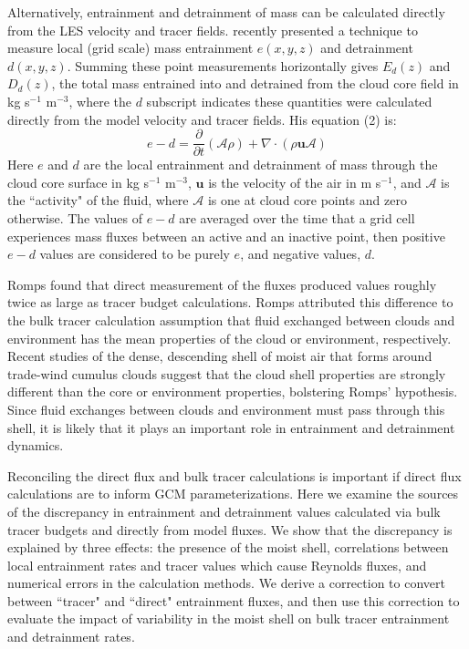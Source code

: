 \documentclass[12pt]{article}
\begin{document}
Alternatively, entrainment and detrainment of mass can be calculated directly from the 
LES velocity and tracer fields.  \cite{Romps2010} recently presented a 
technique to measure local (grid scale) mass entrainment $e(x,y,z)$ and detrainment 
$d(x,y,z)$.  Summing these point measurements horizontally gives $E_d(z)$ and $D_d(z)$,
the total  mass entrained into and detrained from the cloud core field in 
kg s$^{-1}$ m$^{-3}$, where the $d$ subscript indicates these quantities were 
calculated directly from the model velocity and tracer fields.  His equation (2) is:
\begin{equation}
  \label{eq:romps_e_minus_d}
  e - d = \frac{\partial}{\partial t}(\mathcal{A}\rho) 
        + \nabla \cdot (\rho \mathbf{u} \mathcal{A}) 
\end{equation}
Here $e$ and $d$ are the local entrainment and detrainment of mass through the 
cloud core surface in kg s$^{-1}$ m$^{-3}$, $\mathbf{u}$ is the velocity of the 
air in m s$^{-1}$, and $\mathcal{A}$ is the ``activity" of the fluid, where 
$\mathcal{A}$ is one at cloud core points and zero otherwise.  The values of 
$e - d$ are averaged over the time that a grid cell experiences mass fluxes between 
an active and an inactive point, then positive $e-d$ values are considered to be 
purely $e$, and negative values, $d$.  

Romps found that direct measurement of the fluxes produced values roughly twice 
as large as tracer budget calculations.  Romps attributed this difference to 
the bulk tracer calculation assumption that fluid exchanged between clouds 
and environment has the mean properties of the cloud or environment, 
respectively.  Recent studies of the dense, descending shell of moist air that 
forms around trade-wind cumulus clouds \citep{Heus2008, Wang2010} suggest that 
the cloud shell properties are strongly different than the core or environment 
properties, bolstering Romps' hypothesis.  Since fluid exchanges between clouds and
environment must pass through this shell, it is likely that it plays an important 
role in entrainment and detrainment dynamics.

Reconciling the direct flux and bulk tracer calculations is important if direct 
flux calculations are to inform GCM parameterizations.  Here we examine the 
sources of the discrepancy in entrainment and detrainment values calculated via 
bulk tracer budgets and directly from model fluxes.  We show that the discrepancy 
is explained by three effects: the presence of the moist shell, correlations 
between local entrainment rates and tracer values which cause Reynolds fluxes, 
and numerical errors in the calculation methods.  We derive a 
correction to convert between ``tracer" and ``direct" entrainment fluxes, and 
then use this correction to evaluate the impact of variability in the moist 
shell on bulk tracer entrainment and detrainment rates.
\end{document}

